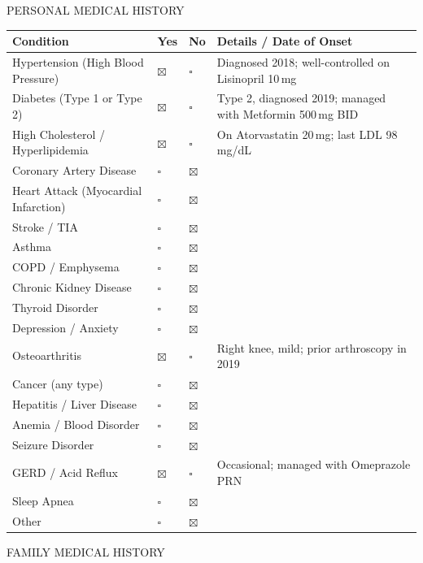 \documentclass[11pt,letterpaper]{article}
\newcommand{\cb}{$\square$}
\newcommand{\cbx}{$\boxtimes$}
\begin{document}
\begin{secbox}
PERSONAL MEDICAL HISTORY
\end{secbox}

\begin{tabularx}{\textwidth}{L{2.2in}C{0.55in}C{0.55in}X}
\toprule
{}
\textbf{Condition} & \textbf{Yes} & \textbf{No} & \textbf{Details / Date of Onset} \\
\midrule
Hypertension (High Blood Pressure) & \cbx & \cb & Diagnosed 2018; well-controlled on Lisinopril 10\,mg\\
Diabetes (Type 1 or Type 2) & \cbx & \cb & Type 2, diagnosed 2019; managed with Metformin 500\,mg BID\\
High Cholesterol / Hyperlipidemia & \cbx & \cb & On Atorvastatin 20\,mg; last LDL 98\,mg/dL\\
Coronary Artery Disease & \cb & \cbx & \\
Heart Attack (Myocardial Infarction) & \cb & \cbx & \\
Stroke / TIA & \cb & \cbx & \\
Asthma & \cb & \cbx & \\
COPD / Emphysema & \cb & \cbx & \\
Chronic Kidney Disease & \cb & \cbx & \\
Thyroid Disorder & \cb & \cbx & \\
Depression / Anxiety & \cb & \cbx & \\
Osteoarthritis & \cbx & \cb & Right knee, mild; prior arthroscopy in 2019\\
Cancer (any type) & \cb & \cbx & \\
Hepatitis / Liver Disease & \cb & \cbx & \\
Anemia / Blood Disorder & \cb & \cbx & \\
Seizure Disorder & \cb & \cbx & \\
GERD / Acid Reflux & \cbx & \cb & Occasional; managed with Omeprazole PRN\\
Sleep Apnea & \cb & \cbx & \\
Other & \cb & \cbx & \\
\bottomrule
\end{tabularx}

\newpage

\begin{secbox}
FAMILY MEDICAL HISTORY
\end{secbox}
\end{document}
